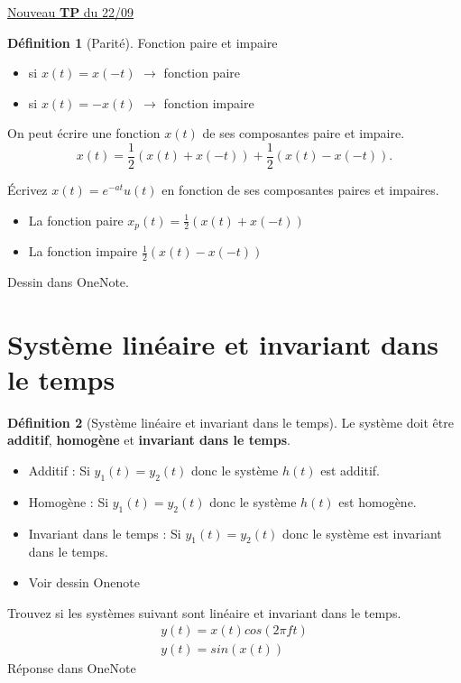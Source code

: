 \documentclass{article}
\theoremstyle{plain}%
\theoremstyle{definition}
\newtheorem{defn}{Définition}[section]
\theoremstyle{remark}
\begin{document}
\underline{Nouveau \textbf{TP} du 22/09} \\

\begin{defn}[Parité]
    Fonction paire et impaire 
    \begin{itemize}
        \item si $ x(t) = x(-t) $ $\rightarrow$ fonction paire
        \item si $ x(t) = -x(t) $ $\rightarrow$ fonction impaire
    \end{itemize}
    On peut écrire une fonction $ x(t) $ de ses composantes paire et impaire.
    \[
        x(t) = \frac{1}{2}(x(t) + x(-t)) + \frac{1}{2}(x(t) - x(-t))
    .\]
\end{defn}


\begin{xca}[1]
    Écrivez $ x(t) = e^{-at}u(t)$ en fonction de ses composantes paires et impaires. \begin{itemize}
        \item La fonction paire $ x_p(t) = \frac{1}{2}(x(t) + x(-t)) $ 
        \item La fonction impaire $ \frac{1}{2} (x(t) - x(-t)) $ 
    \end{itemize}
    Dessin dans OneNote.
\end{xca}

\section{Système linéaire et invariant dans le temps}
\begin{defn}[Système linéaire et invariant dans le temps]
    Le système doit être \textbf{additif}, \textbf{homogène} et \textbf{invariant dans le temps}. \begin{itemize}
        \item Additif : Si $ y_1(t) = y_2(t) $ donc le système $ h(t) $ est additif.
        \item Homogène : Si $ y_1(t) = y_2(t) $ donc le système $ h(t) $ est homogène.
        \item Invariant dans le temps : Si $ y_1(t) = y_2(t) $ donc le système est invariant dans le temps.
        \item Voir dessin Onenote
    \end{itemize}
\end{defn}

\begin{xca}[2]
    Trouvez si les systèmes suivant sont linéaire et invariant dans le temps.\begin{align}
        y(t) = x(t)cos(2 \pi ft)\\
        y(t) = sin(x(t))
    \end{align}
    Réponse dans OneNote
\end{xca}
\end{document}
